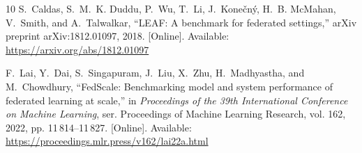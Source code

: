 \documentclass[conference]{IEEEtran}
\begin{document}
\begin{thebibliography}{10}
\BIBentryALTinterwordspacing
S.~Caldas, S.~M.~K. Duddu, P.~Wu, T.~Li, J.~Kone{\v{c}}n{\'y}, H.~B. McMahan,
  V.~Smith, and A.~Talwalkar, ``{LEAF}: A benchmark for federated settings,''
  arXiv preprint arXiv:1812.01097, 2018. [Online]. Available:
  \url{https://arxiv.org/abs/1812.01097}
\BIBentrySTDinterwordspacing

\BIBentryALTinterwordspacing
F.~Lai, Y.~Dai, S.~Singapuram, J.~Liu, X.~Zhu, H.~Madhyastha, and M.~Chowdhury,
  ``{FedScale}: Benchmarking model and system performance of federated learning
  at scale,'' in \emph{Proceedings of the 39th International Conference on
  Machine Learning}, ser. Proceedings of Machine Learning Research, vol. 162,
  2022, pp. 11\,814--11\,827. [Online]. Available:
  \url{https://proceedings.mlr.press/v162/lai22a.html}
\BIBentrySTDinterwordspacing

\end{thebibliography}

\end{document}
